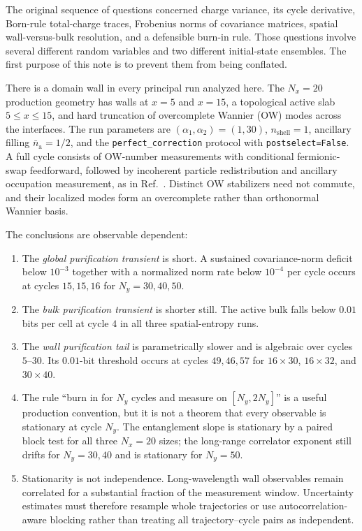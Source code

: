 \documentclass[aps,prb,twocolumn,nofootinbib,superscriptaddress,floatfix]{revtex4-2}
\begin{document}
The original sequence of questions concerned charge variance, its cycle
derivative, Born-rule total-charge traces, Frobenius norms of covariance
matrices, spatial wall-versus-bulk resolution, and a defensible burn-in rule.
Those questions involve several different random variables and two different
initial-state ensembles.  The first purpose of this note is to prevent them
from being conflated.

There is a domain wall in every principal run analyzed here.  The $N_x=20$
production geometry has walls at $x=5$ and $x=15$, a topological active slab
$5\le x\le15$, and hard truncation of overcomplete Wannier (OW) modes across
the interfaces.  The run parameters are
$(\alpha_1,\alpha_2)=(1,30)$, $n_{\mathrm{shell}}=1$, ancillary filling
$\bar n_{\mathrm a}=1/2$, and the \texttt{perfect\_correction} protocol with
\texttt{postselect=False}.  A full cycle consists of OW-number measurements
with conditional fermionic-swap feedforward, followed by incoherent particle
redistribution and ancillary occupation measurement, as in
Ref.~\cite{Bhuiyan2026}.  Distinct OW stabilizers need not commute, and their
localized modes form an overcomplete rather than orthonormal Wannier basis.

The conclusions are observable dependent:
\begin{enumerate}
  \item The \emph{global purification transient} is short.  A sustained
  covariance-norm deficit below $10^{-3}$ together with a normalized norm rate
  below $10^{-4}$ per cycle occurs at cycles $15,15,16$ for
  $N_y=30,40,50$.
  \item The \emph{bulk purification transient} is shorter still.  The active
  bulk falls below $0.01$ bits per cell at cycle $4$ in all three
  spatial-entropy runs.
  \item The \emph{wall purification tail} is parametrically slower and is
  algebraic over cycles $5$--$30$.  Its $0.01$-bit threshold occurs at cycles
  $49,46,57$ for $16\times30$, $16\times32$, and $30\times40$.
  \item The rule ``burn in for $N_y$ cycles and measure on
  $[N_y,2N_y]$'' is a useful production convention, but it is not a theorem
  that every observable is stationary at cycle $N_y$.  The entanglement slope
  is stationary by a paired block test for all three $N_x=20$ sizes; the
  long-range correlator exponent still drifts for $N_y=30,40$ and is stationary
  for $N_y=50$.
  \item Stationarity is not independence.  Long-wavelength wall observables
  remain correlated for a substantial fraction of the measurement window.
  Uncertainty estimates must therefore resample whole trajectories or use
  autocorrelation-aware blocking rather than treating all trajectory--cycle
  pairs as independent.
\end{enumerate}
\end{document}
